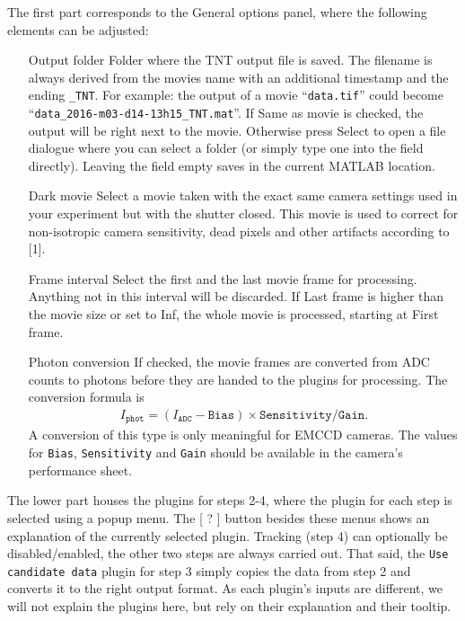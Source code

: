 \documentclass[11pt,onside]{report}
\numberwithin{equation}{chapter}
\begin{document}
The first part corresponds to the \textsf{General options} panel, where the following elements can be adjusted:
\begin{itemize}[leftmargin=3.5cm]
\item[\textsf{Output folder}] Folder where the TNT output file is saved. The filename is always derived from the movies name with an additional timestamp and the ending \texttt{\_TNT}. For example: the output of a movie ``\texttt{data.tif}'' could become ``\texttt{data\_2016-m03-d14-13h15\_TNT.mat}''. If \textsf{Same as movie} is checked, the output will be right next to the movie. Otherwise press \textsf{Select} to open a file dialogue where you can select a folder (or simply type one into the field directly). Leaving the field empty saves in the current MATLAB location.
\item[\textsf{Dark movie}] Select a movie taken with the exact same camera settings used in your experiment but with the shutter closed. This movie is used to correct for non-isotropic camera sensitivity, dead pixels and other artifacts according to [1].
\item[\textsf{Frame interval}] Select the first and the last movie frame for processing. Anything not in this interval will be discarded. If \textsf{Last frame} is higher than the movie size or set to \textsf{Inf}, the whole movie is processed, starting at \textsf{First frame}.
\item[\textsf{Photon conversion}] If checked, the movie frames are converted from ADC counts to photons before they are handed to the plugins for processing. The conversion formula is
\begin{align}
I_{\texttt{phot}} = (I_{\texttt{ADC}}-\texttt{Bias})\times\texttt{Sensitivity}/\texttt{Gain}.
\end{align}
A conversion of this type is only meaningful for EMCCD cameras. The values for \texttt{Bias}, \texttt{Sensitivity} and \texttt{Gain} should be available in the camera's performance sheet.
\end{itemize}

The lower part houses the plugins for steps 2-4, where the plugin for each step is selected using a popup menu. The [ \textsf{?} ] button besides these menus shows an explanation of the currently selected plugin. Tracking (step 4) can optionally be disabled/enabled, the other two steps are always carried out. That said, the \texttt{Use candidate data} plugin for step 3 simply copies the data from step 2 and converts it to the right output format. As each plugin's inputs are different, we will not explain the plugins here, but rely on their explanation and their tooltip.\\
\end{document}
